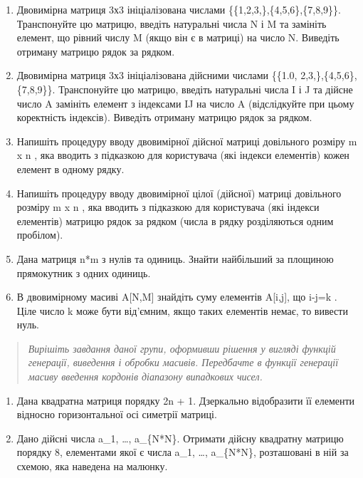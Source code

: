 \documentclass[]{article}
\begin{document}
\begin{enumerate}
\def\labelenumi{\arabic{enumi})}
\item
  Двовимірна матриця 3х3 ініціалізована числами
  \{\{1,2,3,\},\{4,5,6\},\{7,8,9\}\}. Транспонуйте цю матрицю, введіть
  натуральні числа N і M та замініть елемент, що рівний числу M (якщо
  він є в матриці) на число N. Виведіть отриману матрицю рядок за
  рядком.
\item
  Двовимірна матриця 3х3 ініціалізована дійсними числами \{\{1.0,
  2,3,\},\{4,5,6\},\{7,8,9\}\}. Транспонуйте цю матрицю, введіть
  натуральні числа I і J та дійсне число A замініть елемент з індексами
  IJ на число A (відслідкуйте при цьому коректність індексів). Виведіть
  отриману матрицю рядок за рядком.
\item
  Напишіть процедуру вводу двовимірної дійсної матриці довільного
  розміру m x n , яка вводить з підказкою для користувача (які індекси
  елементів) кожен елемент в одному рядку.
\item
  Напишіть процедуру вводу двовимірної цілої (дійсної) матриці
  довільного розміру m x n , яка вводить з підказкою для користувача
  (які індекси елементів) матрицю рядок за рядком (числа в рядку
  розділяються одним пробілом).
\item
  Дана матриця n*m з нулів та одиниць. Знайти найбільший за площиною
  прямокутник з одних одиниць.
\item
  В двовимірному масиві A{[}N,M{]} знайдіть суму елементів A{[}i,j{]},
  що i-j=k . Ціле число k може бути від'ємним, якщо таких елементів
  немає, то вивести нуль.
\end{enumerate}

\begin{quote}
\emph{\emph{Вирішіть завдання даної групи, оформивши рішення у вигляді
функцій генерації, виведення і обробки масивів. Передбачте в функції
генерації масиву введення кордонів діапазону випадкових чисел.}}
\end{quote}

\begin{enumerate}
\def\labelenumi{\arabic{enumi})}
\item
  Дана квадратна матриця порядку 2n + 1. Дзеркально відобразити її
  елементи відносно горизонтальної осі симетрії матриці.
\item
  Дано дійсні числа a\_1, \ldots{}, a\_\{N*N\}. Отримати дійсну
  квадратну матрицю порядку 8, елементами якої є числа a\_1, \ldots{},
  a\_\{N*N\}, розташовані в ній за схемою, яка наведена на малюнку.
\end{enumerate}
\end{document}
